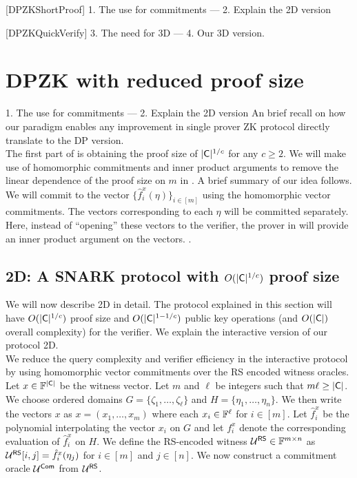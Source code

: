 [DPZKShortProof]
1. The use for commitments --- 2. Explain the 2D version  

[DPZKQuickVerify]
3. The need for 3D --- 4. Our 3D version.


\section{DPZK with reduced proof size}
1. The use for commitments --- 2. Explain the 2D version  
An brief recall on how our paradigm enables any improvement in single prover ZK protocol directly translate to the DP version.\\

The first part of \name{} is obtaining the proof size of $|\mathsf{C}|^{1/c}$ for any $c \geq 2$.
We will make use of homomorphic commitments and inner product arguments to remove the linear dependence of the proof size on $m$ in \cite{Ligero2017}. A brief summary of our idea follows. We will commit to the vector $\{\hat{f}^x_i(\eta)\}_{i \in [m]}$ using the homomorphic vector commitments. The vectors corresponding to each $\eta$ will be committed separately. Here, instead of ``opening'' these vectors to the verifier, the prover in \name{} will provide an inner product argument on the vectors.
.

\subsection{\name2D{}: A SNARK protocol with $O(|\mathsf{C}|^{1/c})$ proof size}

We will now describe \name2D{} in detail. The protocol explained in this section will have $O(|\mathsf{C}|^{1/c})$ proof size and $O(|\mathsf{C}|^{1-1/c})$ public key operations (and $O(|\mathsf{C}|)$ overall complexity) for the verifier. We  explain the interactive version of our protocol \name2D{}. \\

We reduce the query complexity and verifier efficiency in the interactive protocol by using homomorphic vector commitments over the RS encoded witness oracles. Let $x \in \mathbb{F}^{|\mathsf{C}|}$ be the witness vector. Let $m$ and $\ell$ be integers such that $m\ell\geq |\mathsf{C}|$. We choose ordered domains $G=\{\zeta_1,\ldots,\zeta_\ell\}$ and $H=\{\eta_1,\ldots,\eta_n\}$. We then write the vectors $x$ as $x = (x_{1},\ldots,x_{m})$ where each $x_{i}\in \mathbb{F}^\ell$ for $i \in [m]$. Let $\hat{f}^x_{i}$ be the polynomial interpolating the vector $x_{i}$ on $G$ and let $f^x_{i}$ denote the corresponding evaluation of $\hat{f}^x_{i}$ on $H$. We define the RS-encoded witness $\mathcal{U}^{\mathsf{RS}}\in \mathbb{F}^{m\times n}$ as $\mathcal{U}^{\mathsf{RS}}[i,j]=\hat{f}^x_{i}(\eta_j)$ for $ i\in [m]$ and $j\in [n]$. We now construct a commitment oracle $\mathcal{U}^{\mathsf{Com}}$ from $\mathcal{U}^{\mathsf{RS}}$.

